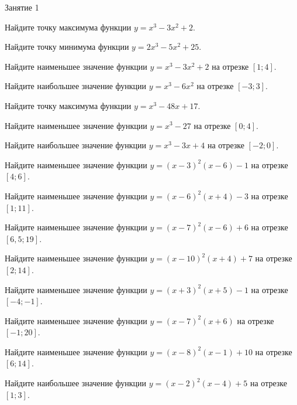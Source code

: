 %
%

\begin{class}[number=1]
	\begin{listofex}
		\item Занятие 1
	\end{listofex}
\end{class}

\begin{class}[number=2]
	\begin{listofex}
		\item Найдите точку максимума функции \( y=x^3-3x^2+2 \).
		\item Найдите точку минимума функции \( y=2x^3-5x^2+25 \).
		\item Найдите наименьшее значение функции \(y=x^3-3x^2+2\) на отрезке \( [1;4] \).
		\item Найдите наибольшее значение функции \(y=x^3-6x^2\) на отрезке \( [-3;3] \).
		\item Найдите точку максимума функции \( y=x^3-48x+17 \).
		\item Найдите наименьшее значение функции \( y=x^3-27 \) на отрезке \([0;4]\).
		\item Найдите наибольшее значение функции \( y=x^3-3x+4 \) на отрезке \([-2;0]\).
		
		\item Найдите наименьшее значение функции \( y=(x-3)^2(x-6)-1 \) на отрезке \( [4;6] \).
		\item Найдите наименьшее значение функции \( y=(x-6)^2(x+4)-3 \) на отрезке \( [1;11] \).
		\item Найдите наименьшее значение функции \( y=(x-7)^2(x-6)+6 \) на отрезке \( [6,5;19] \).
		\item Найдите наименьшее значение функции \( y=(x-10)^2(x+4)+7 \) на отрезке \( [2;14] \).
		\item Найдите наименьшее значение функции \( y=(x+3)^2(x+5)-1 \) на отрезке \([-4;-1]\).
		\item Найдите наименьшее значение функции \( y=(x-7)^2(x+6) \) на отрезке \([-1;20]\).
		\item Найдите наименьшее значение функции \( y=(x-8)^2(x-1)+10 \) на отрезке \([6;14]\).
		\item Найдите наибольшее значение функции \( y=(x-2)^2(x-4)+5 \) на отрезке \([1;3]\).
		

\end{listofex}
\end{class}
